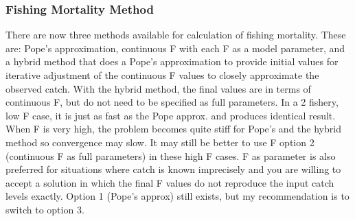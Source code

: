 \subsubsection{Fishing Mortality Method}
There are now three methods available for calculation of fishing mortality.  These are:  Pope’s approximation, continuous F with each F as a model parameter, and a hybrid method that does a Pope’s approximation to provide initial values for iterative adjustment of the continuous F values to closely approximate the observed catch.  With the hybrid method, the final values are in terms of continuous F, but do not need to be specified as full parameters.  In a 2 fishery, low F case, it is just as fast as the Pope approx. and produces identical result.  When F is very high, the problem becomes quite stiff for Pope’s and the hybrid method so convergence may slow.  It may still be better to use F option 2 (continuous F as full parameters) in these high F cases.  F as parameter is also preferred for situations where catch is known imprecisely and you are willing to accept a solution in which the final F values do not reproduce the input catch levels exactly.  Option 1 (Pope’s approx) still exists, but my recommendation is to switch to option 3.

